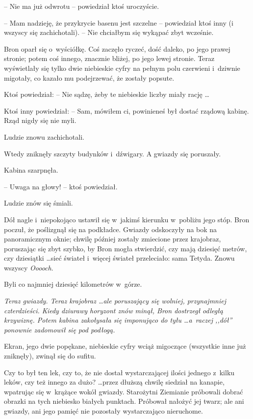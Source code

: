 \documentclass[oneside,polish,11pt,rmheadings]{mwbk}
\begin{document}
-- Nie ma już odwrotu -- powiedział ktoś uroczyście. 

-- Mam nadzieję, że przykrycie basenu jest szczelne -- powiedział ktoś inny (i wszyscy się zachichotali). -- Nie chciałbym się wykąpać zbyt wcześnie. 

Bron oparł się o~wyściółkę. Coś zaczęło ryczeć, dość daleko, po jego prawej stronie; potem coś innego, znacznie bliżej, po jego lewej stronie. Teraz wyświetlały się tylko dwie niebieskie cyfry na pełnym polu czerwieni i~dziwnie migotały, co kazało mu podejrzewać, że zostały popsute. 

Ktoś powiedział: -- Nie sądzę, żeby te niebieskie liczby miały rację \ldots  

Ktoś inny powiedział: -- Sam, mówiłem ci, powinieneś był dostać rządową kabinę. Rząd nigdy się nie myli. 

Ludzie znowu zachichotali. 

Wtedy zniknęły szczyty budynków i~dźwigary. A gwiazdy się poruszały. 

Kabina szarpnęła. 

-- Uwaga na głowy! --  ktoś powiedział. 

Ludzie znów się śmiali. 

Dół nagle i~niepokojąco ustawił się w~jakimś kierunku w~pobliżu jego stóp. Bron poczuł, że poślizgnął się na podkładce. Gwiazdy odskoczyły na bok na panoramicznym oknie; chwilę później zostały zmiecione przez krajobraz, poruszając się zbyt szybko, by Bron mogła stwierdzić, czy mają dziesięć metrów, czy dziesiątki \ldots  sieć świateł i~więcej świateł przeleciało: sama Tetyda. Znowu wszyscy \textit{Ooooch}. 

Byli co najmniej dziesięć kilometrów w~górze. 

\textit{Teraz gwiazdy. Teraz krajobraz \ldots  ale poruszający się wolniej, przynajmniej czterdzieści. Kiedy dziurawy horyzont znów minął, Bron dostrzegł odległą krzywiznę. Potem kabina zakołysała się imponująco do tyłu \ldots  a~raczej ,,dół'' ponownie zadomowił się pod podłogą.} 

Ekran, jego dwie popękane, niebieskie cyfry wciąż migoczące (wszystkie inne już zniknęły), zwinął się do sufitu. 

Czy to był ten lek, czy to, że nie dostał wystarczającej ilości jednego z~kilku leków, czy też innego za dużo?  \ldots  przez dłuższą chwilę siedział na kanapie, wpatrując się w~krążące wokół gwiazdy. Starożytni Ziemianie próbowali dobrać obrazki na tych niebiesko \dywiz białych punktach. Próbował nałożyć jej twarz; ale ani gwiazdy, ani jego pamięć nie pozostały wystarczająco nieruchome. 
\end{document}

